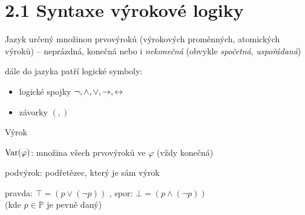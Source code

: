 \documentclass{beamer}
\begin{document}
\section{2.1 Syntaxe výrokové logiky}


\begin{frame}{Jazyk}
    určený množinou \alert{prvovýroků} (\alert{výrokových proměnných}, \alert{atomických výroků}) -- neprázdná, konečná nebo i \emph{nekonečná}
    (obvykle \emph{spočetná}, \emph{uspořádaná})

    dále do jazyka patří \alert{logické symboly}:
    \begin{itemize}
        \item logické spojky $\neg,{\land},{\lor}, {\mathbin{\rightarrow}}, {\mathbin{\leftrightarrow}}$
        \item závorky $(,)$
    \end{itemize}
\end{frame}


\begin{frame}{Výrok}


    \vspace{-6pt}
    \alert{$\operatorname{Var}(\varphi)$}: množina všech prvovýroků ve $\varphi$ (vždy konečná)

    \alert{podvýrok}: podřetězec, který je sám výrok
    

    \vspace{-6pt}
    
    \alert{pravda}: $\top=(p\lor(\neg p))$ , \alert{spor}: $\bot=(p\land(\neg p))$ \\
    (kde $p\in\mathbb P$ je pevně daný)

\end{frame}
\end{document}

